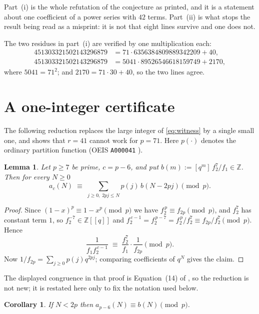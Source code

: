 \documentclass[11pt]{amsart}
\newtheorem{lemma}[theorem]{Lemma}
\newtheorem{corollary}[theorem]{Corollary}
\theoremstyle{definition}
\theoremstyle{remark}
\begin{document}
Part~(i) is the whole refutation of the conjecture as printed, and it is a statement about
one coefficient of a power series with $42$ terms. Part~(ii) is what stops the result
being read as a misprint: it is not that eight lines survive and one does not.

The two residues in part~(i) are verified by one multiplication each:
\begin{align}
 451303321502143296879&=71\cdot 6356384809889342209+40, \label{eq:div1}\\
 451303321502143296879&=5041\cdot 89526546618159749+2170,\label{eq:div2}
\end{align}
where $5041=71^2$; and $2170=71\cdot30+40$, so the two lines agree.

\section{A one-integer certificate}\label{sec:cert}

The following reduction replaces the large integer of \eqref{eq:witness} by a single small
one, and shows that $r=41$ cannot work for $p=71$. Here $p(\cdot)$ denotes the ordinary
partition function (OEIS \texttt{A000041} \cite{A000041}).

\begin{lemma}\label{lem:red}
Let $p\ge7$ be prime, $c=p-6$, and put
$b(m):=[q^m]\,f_2^{7}/f_1\in\mathbb{Z}$. Then for every $N\ge0$
\[
 a_c(N)\;\equiv\;\sum_{j\ge0,\;2pj\le N}p(j)\,b(N-2pj)\pmod p .
\]
\end{lemma}

\begin{proof}
Since $(1-x)^p\equiv1-x^p\pmod p$ we have $f_2^{\,p}\equiv f_{2p}\pmod p$, and $f_2^{7}$
has constant term $1$, so $f_2^{-7}\in\mathbb{Z}[[q]]$ and
$f_2^{\,c-1}=f_2^{\,p-7}=f_2^{\,p}/f_2^{7}\equiv f_{2p}/f_2^{7}\pmod p$. Hence
\[
 \frac{1}{f_1f_2^{\,c-1}}\;\equiv\;\frac{f_2^{7}}{f_1}\cdot\frac{1}{f_{2p}}\pmod p .
\]
Now $1/f_{2p}=\sum_{j\ge0}p(j)q^{2pj}$; comparing coefficients of $q^N$ gives the claim.
\end{proof}

The displayed congruence in that proof is Equation~(14) of \cite{Gua}, so the reduction is
not new; it is restated here only to fix the notation used below.

\begin{corollary}\label{cor:red}
If $N<2p$ then $a_{p-6}(N)\equiv b(N)\pmod p$.
\end{corollary}
\end{document}
